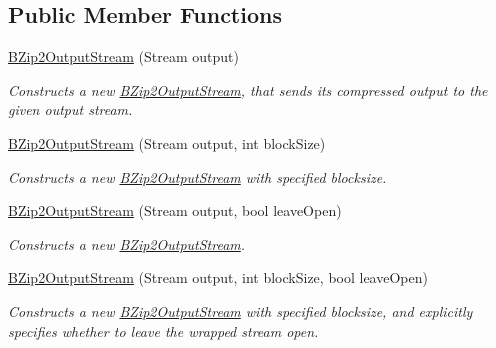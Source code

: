 \subsection*{Public Member Functions}
\begin{DoxyCompactItemize}
\item 
\mbox{\hyperlink{class_super_tiled2_unity_1_1_ionic_1_1_b_zip2_1_1_b_zip2_output_stream_ae74c1b1e130afe332398798a774dbcbf}{B\+Zip2\+Output\+Stream}} (Stream output)
\begin{DoxyCompactList}\small\item\em Constructs a new {\ttfamily \mbox{\hyperlink{class_super_tiled2_unity_1_1_ionic_1_1_b_zip2_1_1_b_zip2_output_stream}{B\+Zip2\+Output\+Stream}}}, that sends its compressed output to the given output stream. \end{DoxyCompactList}\item 
\mbox{\hyperlink{class_super_tiled2_unity_1_1_ionic_1_1_b_zip2_1_1_b_zip2_output_stream_a8ea58c642975a50c8d6ecb65d503f7a6}{B\+Zip2\+Output\+Stream}} (Stream output, int block\+Size)
\begin{DoxyCompactList}\small\item\em Constructs a new {\ttfamily \mbox{\hyperlink{class_super_tiled2_unity_1_1_ionic_1_1_b_zip2_1_1_b_zip2_output_stream}{B\+Zip2\+Output\+Stream}}} with specified blocksize. \end{DoxyCompactList}\item 
\mbox{\hyperlink{class_super_tiled2_unity_1_1_ionic_1_1_b_zip2_1_1_b_zip2_output_stream_a7836d23136d82e9751ffa8753f6a4323}{B\+Zip2\+Output\+Stream}} (Stream output, bool leave\+Open)
\begin{DoxyCompactList}\small\item\em Constructs a new {\ttfamily \mbox{\hyperlink{class_super_tiled2_unity_1_1_ionic_1_1_b_zip2_1_1_b_zip2_output_stream}{B\+Zip2\+Output\+Stream}}}. \end{DoxyCompactList}\item 
\mbox{\hyperlink{class_super_tiled2_unity_1_1_ionic_1_1_b_zip2_1_1_b_zip2_output_stream_a7ed2570373b15f57d656739757497616}{B\+Zip2\+Output\+Stream}} (Stream output, int block\+Size, bool leave\+Open)
\begin{DoxyCompactList}\small\item\em Constructs a new {\ttfamily \mbox{\hyperlink{class_super_tiled2_unity_1_1_ionic_1_1_b_zip2_1_1_b_zip2_output_stream}{B\+Zip2\+Output\+Stream}}} with specified blocksize, and explicitly specifies whether to leave the wrapped stream open. \end{DoxyCompactList}\item 

\end{DoxyCompactItemize}

